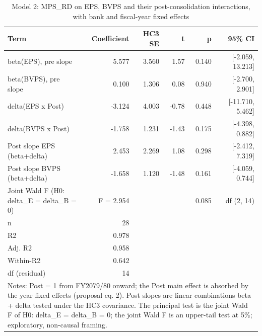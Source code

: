 \begin{table}[htbp]
\centering
\caption{Model 2: MPS\_RD on EPS, BVPS and their post-consolidation interactions, with bank and fiscal-year fixed effects}
\label{tab:t4_model2}
\begin{tabular}{lrrrrr}
\toprule
Term & Coefficient & HC3 SE & t & p & 95\% CI \\
\midrule
beta(EPS), pre slope & 5.577 & 3.560 & 1.57 & 0.140 & [-2.059, 13.213] \\
beta(BVPS), pre slope & 0.100 & 1.306 & 0.08 & 0.940 & [-2.700, 2.901] \\
delta(EPS x Post) & -3.124 & 4.003 & -0.78 & 0.448 & [-11.710, 5.462] \\
delta(BVPS x Post) & -1.758 & 1.231 & -1.43 & 0.175 & [-4.398, 0.882] \\
Post slope EPS (beta+delta) & 2.453 & 2.269 & 1.08 & 0.298 & [-2.412, 7.319] \\
Post slope BVPS (beta+delta) & -1.658 & 1.120 & -1.48 & 0.161 & [-4.059, 0.744] \\
Joint Wald F (H0: delta\_E = delta\_B = 0) & F = 2.954 &  &  & 0.085 & df (2, 14) \\
n & 28 &  &  &  &  \\
R2 & 0.978 &  &  &  &  \\
Adj. R2 & 0.958 &  &  &  &  \\
Within-R2 & 0.642 &  &  &  &  \\
df (residual) & 14 &  &  &  &  \\
\midrule
\multicolumn{6}{l}{\footnotesize Notes: Post = 1 from FY2079/80 onward; the Post main effect is absorbed by the year fixed effects (proposal eq. 2). Post slopes are linear combinations beta + delta tested under the HC3 covariance. The principal test is the joint Wald F of H0: delta\_E = delta\_B = 0; the joint Wald F is an upper-tail test at 5\%; exploratory, non-causal framing.} \\
\bottomrule
\end{tabular}
\end{table}
